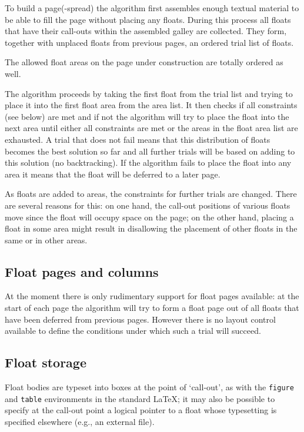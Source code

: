 \documentclass[twocolumn]{article}
\begin{document}
To build a page(-spread) the algorithm first assembles enough textual
material to be able to fill the page without placing any floats.
During this process all floats that have their call-outs within the
assembled galley are collected. They form, together with unplaced
floats from previous pages, an ordered trial list of floats.

The allowed float areas on the page under construction are totally
ordered as well.

The algorithm proceeds by taking the first float from the trial list
and trying to place it into the first float area from the area
list. It then checks if all constraints (see below) are met and if not
the algorithm
will try to place the float into the next area until either all
constraints are met or the areas in the float area list are exhausted.
A trial that does not fail means that
this distribution of floats becomes the best solution so far and all
further trials will be based on adding to this solution (no
backtracking). If the algorithm fails to place the float into any
area it means that the float will be deferred to a later page.

As floats are added to areas, the constraints for further trials 
are changed. There are several reasons for this:
on one hand, the call-out positions of
various floats move
since the float will occupy space on the page; on the other hand,
placing a float in some area might result in disallowing the placement
of other floats in the same or in other areas.


\subsection{Float pages and columns}

At the moment there is only rudimentary support for float pages
available: at the start of each page the algorithm will try to form a
float page out of all floats that have been deferred from previous
pages. However there is no layout control available to define the
conditions under which such a trial will succeed.


\subsection{Float storage}

Float bodies are typeset into boxes at the point of `call-out', as
with the \texttt{figure} and \texttt{table} environments in the standard
\LaTeX; it may also be possible to specify at the call-out point a
logical pointer to a float whose typesetting is specified elsewhere
(e.g., an external file).
\end{document}
